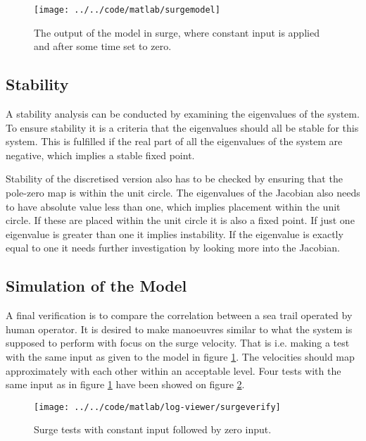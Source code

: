 \begin{figure}
  \centering
  \texttt{[image: ../../code/matlab/surgemodel]}
  \caption{The output of the model in surge, where constant input is applied and after some time set to zero.}
  \label{fig:surgevel}
\end{figure}

\subsection{Stability}
A stability analysis can be conducted by examining the eigenvalues of the system. To ensure stability it is a criteria that the eigenvalues should all be stable for this system. This is fulfilled if the real part of all the eigenvalues of the system are negative, which implies a stable fixed point.

Stability of the discretised version also has to be checked by ensuring that the pole-zero map is within the unit circle. The eigenvalues of the Jacobian also needs to have absolute value less than one, which implies placement within the unit circle. If these are placed within the unit circle it is also a fixed point. If just one eigenvalue is greater than one it implies instability. If the eigenvalue is exactly equal to one it needs further investigation by looking more into the Jacobian.

\subsection{Simulation of the Model}
A final verification is to compare the correlation between a sea trail operated by human operator. It is desired to make manoeuvres similar to what the system is supposed to perform with focus on the surge velocity. That is i.e. making a test with the same input as given to the model in figure \ref{fig:surgevel}. The velocities should map approximately with each other within an acceptable level. Four tests with the same input as in figure \ref{fig:surgevel} have been showed on figure \ref{fig:surgeverify}.

\begin{figure}
  \centering
  \texttt{[image: ../../code/matlab/log-viewer/surgeverify]}
  \caption{Surge tests with constant input followed by zero input.}
  \label{fig:surgeverify}
\end{figure}

